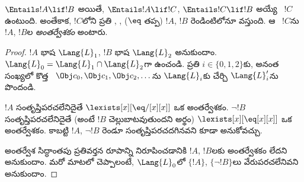 \documentclass[../../../include/open-logic-section]{subfiles}
\begin{document}


\begin{thm}[క్రేగ్ అంతర్వేశ సిద్ధాంతం]
$\Entails !A \lif !B$ అయితే, $\Entails !A \lif !C$,
$\Entails !C \lif !B$ అయ్యే ~$!C$
ఉంటుంది. అంతేకాక, $!C$లోని ప్రతి
,
,
 ($\eq$ తప్ప) $!A$, $!B$
రెండింటిలోనూ వస్తుంది. ఆ ~$!C$ను
$!A$, $!B$ల \emph{అంతర్వేశకం} అంటారు.
\end{thm}

\begin{proof}
$!A$ భాష $\Lang{L}_1$, $!B$ భాష $\Lang{L}_2$
అనుకుందాం. $\Lang{L}_0 = \Lang{L}_1 \cap \Lang{L}_2$గా ఉంచండి.
ప్రతి $i \in \{0, 1, 2 \}$కు, అనంత సంఖ్యలో కొత్త
~$\Obj c_0, \Obj c_1,
\Obj c_2, \dots$ను $\Lang{L}_i$కు చేర్చి $\Lang{L}'_i$ను పొందండి.

$!A$ సంతృప్తిపరచలేనిదైతే $\lexists[x][\eq/[x][x]]$ ఒక
అంతర్వేశకం. $\lnot !B$ సంతృప్తిపరచలేనిదైతే (అంటే $!B$
చెల్లుబాటవుతుందని అర్థం) $\lexists[x][\eq[x][x]]$ ఒక అంతర్వేశకం. కాబట్టి
$!A$, $\lnot !B$ రెండూ సంతృప్తిపరచదగినవని కూడా అనుకోవచ్చు.

అంతర్వేశ సిద్ధాంతపు ప్రతివర్తన రూపాన్ని నిరూపించడానికి $!A$, $!B$లకు
అంతర్వేశకం లేదని అనుకుందాం. మరో మాటలో చెప్పాలంటే,
$\Lang{L}_0$లో $\{!A\}$, $\{\lnot !B\}$లు వేరుపరచలేనివని
అనుకుందాం.


\end{proof}
\end{document}
